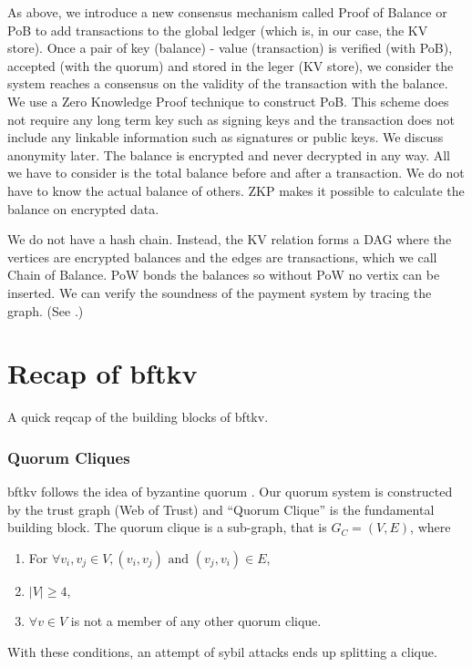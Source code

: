 \documentclass[10pt,fleqn]{article}
\begin{document}
As above, we introduce a new consensus mechanism called Proof of Balance or PoB to add transactions to the global ledger (which is, in our case, the KV store). Once a pair of key (balance) - value (transaction) is verified (with PoB), accepted (with the quorum) and stored in the leger (KV store), we consider the system reaches a consensus on the validity of the transaction with the balance. We use a Zero Knowledge Proof technique to construct PoB. This scheme does not require any long term key such as signing keys and the transaction does not include any linkable information such as signatures or public keys. We discuss anonymity later. The balance is encrypted and never decrypted in any way. All we have to consider is the total balance before and after a transaction. We do not have to know the actual balance of others. ZKP makes it possible to calculate the balance on encrypted data. 

We do not have a hash chain. Instead, the KV relation forms a DAG where the vertices are encrypted balances and the edges are transactions, which we call Chain of Balance. PoW bonds the balances so without PoW no vertix can be inserted. We can verify the soundness of the payment system by tracing the graph. (See .)

\section{Recap of \textsf{bftkv}}
A quick reqcap of the building blocks of \textsf{bftkv}.

\subsubsection*{Quorum Cliques}

\textsf{bftkv} follows the idea of byzantine quorum \cite{byzantinequorum}. Our quorum system is constructed by the trust graph (Web of Trust) and ``Quorum Clique'' is the fundamental building block. The quorum clique is a sub-graph, that is $G_C = (V, E)$, where
\begin{enumerate}
\item For $\forall v_i, v_j \in V, (v_i, v_j) \text{ and } (v_j, v_i) \in E$,
\item $|V| \ge 4$,
\item $\forall v \in V$ is not a member of any other quorum clique.
\end{enumerate}
With these conditions, an attempt of sybil attacks ends up splitting a clique.
\end{document}
